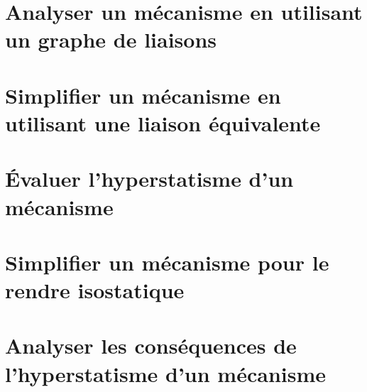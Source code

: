 \section{Analyser un mécanisme en utilisant un graphe de liaisons} 
\section{Simplifier un mécanisme en utilisant une liaison équivalente} 
\section{Évaluer l'hyperstatisme d'un mécanisme} 
\graphicspath{{\repStyle/png/}{../CHS/CHS-03-HS/64_EPAS/images/}} 
 
 
\graphicspath{{\repStyle/png/}{../CHS/CHS-03-HS/69_TrainA350/images/}} 
 
 
\graphicspath{{\repStyle/png/}{../CHS/CHS-03-HS/71_Robovolc/images/}} 
 
 
\graphicspath{{\repStyle/png/}{../CHS/CHS-03-HS/71_Robovolc_02/images/}} 
 
 
\graphicspath{{\repStyle/png/}{../CHS/CHS-03-HS/72_Tripteor/images/}} 
 
 
\graphicspath{{\repStyle/png/}{../CHS/CHS-03-HS/81_Piaggio/images/}} 
 
 
\graphicspath{{\repStyle/png/}{../CHS/CHS-03-HS/82_MAV/images/}} 
 
 
\graphicspath{{\repStyle/png/}{../CHS/CHS-03-HS/83_Roburoc/images/}} 
 
 
\graphicspath{{\repStyle/png/}{../CHS/CHS-03-HS/84_Nacelle/images/}} 
 
 
\section{Simplifier un mécanisme pour le rendre isostatique} 
\section{Analyser les conséquences de l'hyperstatisme d'un mécanisme} 
